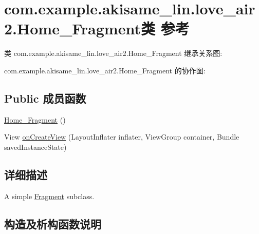 \hypertarget{classcom_1_1example_1_1akisame__lin_1_1love__air2_1_1_home___fragment}{}\section{com.\+example.\+akisame\+\_\+lin.\+love\+\_\+air2.\+Home\+\_\+\+Fragment类 参考}
\label{classcom_1_1example_1_1akisame__lin_1_1love__air2_1_1_home___fragment}


类 com.\+example.\+akisame\+\_\+lin.\+love\+\_\+air2.\+Home\+\_\+\+Fragment 继承关系图\+:


com.\+example.\+akisame\+\_\+lin.\+love\+\_\+air2.\+Home\+\_\+\+Fragment 的协作图\+:
\subsection*{Public 成员函数}
\begin{DoxyCompactItemize}
\item 
\mbox{\hyperlink{classcom_1_1example_1_1akisame__lin_1_1love__air2_1_1_home___fragment_adca8f0e818a01ccc0e753238fb5fe0af}{Home\+\_\+\+Fragment}} ()
\item 
View \mbox{\hyperlink{classcom_1_1example_1_1akisame__lin_1_1love__air2_1_1_home___fragment_a4e1184066d5cae9007dc4b9e342536d2}{on\+Create\+View}} (Layout\+Inflater inflater, View\+Group container, Bundle saved\+Instance\+State)
\end{DoxyCompactItemize}


\subsection{详细描述}
A simple \mbox{\hyperlink{}{Fragment}} subclass. 

\subsection{构造及析构函数说明}
\mbox{\label{classcom_1_1example_1_1akisame__lin_1_1love__air2_1_1_home___fragment_adca8f0e818a01ccc0e753238fb5fe0af}} 
